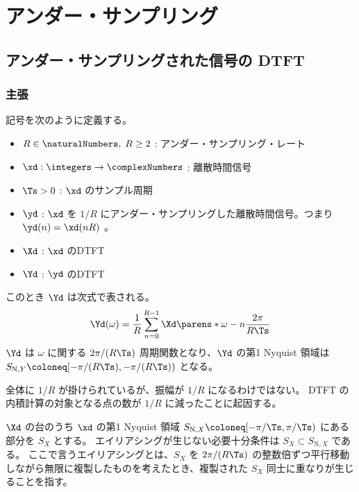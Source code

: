 \chapter{アンダー・サンプリング}
    \section{アンダー・サンプリングされた信号の DTFT}
        \label{アンダー・サンプリングされた信号の DTFT}
        \subsection{主張}
            記号を次のように定義する。
            \begin{itemize}
                \item $R\in\naturalNumbers,\;R\geq 2$ : アンダー・サンプリング・レート
                \item $\xd:\integers\to\complexNumbers$ : 離散時間信号
                \item $\Ts>0$ : $\xd$ のサンプル周期
                \item $\yd$ : $\xd$ を $1/R$ にアンダー・サンプリングした離散時間信号。つまり $\yd(n) = \xd(nR)$ 。
                \item $\Xd$ : $\xd$ のDTFT
                \item $\Yd$ : $\yd$ のDTFT
            \end{itemize}
            このとき $\Yd$ は次式で表される。
            \[ \Yd(\omega) = \frac{1}{R}\sum_{n=0}^{R-1} \Xd\parens*{\omega-n\frac{2\pi}{R\Ts}} \]
            $\Yd$ は $\omega$ に関する $2\pi/(R\Ts)$ 周期関数となり、$\Yd$ の第1 Nyquist 領域は $S_{\text{N},Y} \coloneq [-\pi/(R\Ts),-\pi/(R\Ts))$ となる。
            \par
            全体に $1/R$ が掛けられているが、振幅が $1/R$ になるわけではない。
            DTFT の内積計算の対象となる点の数が $1/R$ に減ったことに起因する。
            \par
            $\Xd$ の台のうち $\xd$ の第1 Nyquist 領域 $S_{\text{N},X} \coloneq [-\pi/\Ts, \pi/\Ts)$ にある部分を $S_X$ とする。
            エイリアシングが生じない必要十分条件は $S_X\subset S_{\text{N},X}$ である。
            ここで言うエイリアシングとは、$S_X$ を $2\pi/(R\Ts)$ の整数倍ずつ平行移動しながら無限に複製したものを考えたとき、複製された $S_X$ 同士に重なりが生じることを指す。
